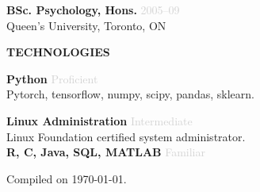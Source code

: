 \documentclass[a4paper,12pt,oneside]{book}
\newcommand{\headingsR}[1]{
    \vspace{2.5mm}
    \noindent\large\leftskip=0.15in\textbf{#1}
    \vspace{2.5mm}
}
\newcommand\listR[1]{
    \vspace{-2.5mm}\begin{itemize}[leftmargin=0.30in]\setlength\itemsep{1.5mm}{#1}\end{itemize}
}
\newcommand{\entryR}[3]{
    \noindent\small\leftskip=0.15in\textbf{#1}
        {\hfill\footnotesize\textcolor{lightgray}{#2}\\
            {\footnotesize\addfontfeature{} #3}\
            \vspace{1mm}
    }
}
\newcommand{\entrysmR}[2]{
    \noindent\small\leftskip=0.15in\textbf{#1}
        \hfill\footnotesize\textcolor{lightgray}{#2}\\
        \vspace{-4mm}
}
\begin{document}
\begin{minipage}[t]{\dimexpr0.37\textwidth+2\fboxrule+2\fboxsep\relax}
\entryR
{BSc. Psychology,  Hons.}{2005--09}
{Queen's University, Toronto, ON}


\headingsR{TECHNOLOGIES}

\entryR
{Python}{Proficient}
{Pytorch, tensorflow, numpy, scipy, pandas, sklearn.}

\entryR
{Linux Administration}{Intermediate}
{Linux Foundation certified system administrator.}\\

\entrysmR
{R, C, Java, SQL, MATLAB}{Familiar}













\end{minipage}

\begin{center}
\small{Compiled on \usdate\today.}
\end{center}
\end{document}
